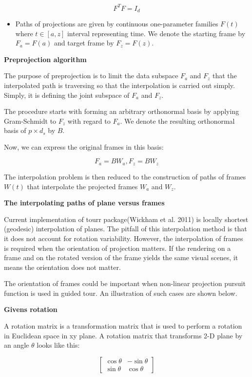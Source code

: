 \[F^TF = I_d\]

\begin{itemize}
\tightlist
\item
  Paths of projections are given by continuous one-parameter families \(F(t)\) where \(t\in [a, z]\) interval representing time. We denote the starting frame by \(F_a = F(a)\) and target frame by \(F_z = F(z)\).
\end{itemize}

\textbf{Preprojection algorithm}

The purpose of preprojection is to limit the data subspace \(F_a\) and \(F_z\) that the interpolated path is traversing so that the interpolation is carried out simply. Simply, it is defining the joint subspace of \(F_a\) and \(F_z\).

The procedure starts with forming an arbitrary orthonormal basis by applying Gram-Schmidt to \(F_z\) with regard to \(F_a\). We denote the resulting orthonormal basis of \(p\times d_s\) by \(B\).

Now, we can express the original frames in this basis:

\[F_a = BW_a, F_z = BW_z\]

The interpolation problem is then reduced to the construction of paths of frames \(W(t)\) that interpolate the projected frames \(W_a\) and \(W_z\).

\textbf{The interpolating paths of plane versus frames}

Current implementation of tourr package(Wickham et al. 2011) is locally shortest (geodesic) interpolation of planes. The pitfall of this interpolation method is that it does not account for rotation variability. However, the interpolation of frames is required when the orientation of projection matters. If the rendering on a frame and on the rotated version of the frame yields the same visual scenes, it means the orientation does not matter.

The orientation of frames could be important when non-linear projection pursuit function is used in guided tour. An illustration of such cases are shown below.

\textbf{Givens rotation}

A rotation matrix is a transformation matrix that is used to perform a rotation in Euclidean space in xy plane. A rotation matrix that transforms 2-D plane by an angle \(\theta\) looks like this:

\[ \begin{bmatrix}\cos \theta &-\sin \theta \\\sin \theta &\cos \theta \end{bmatrix} \]

